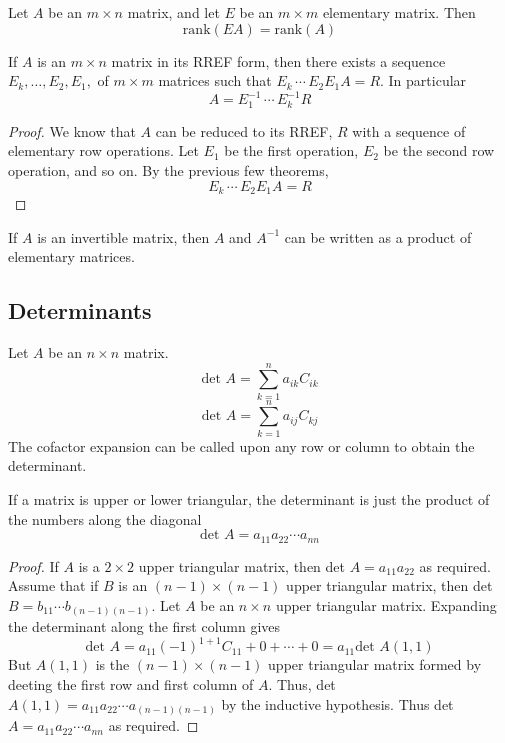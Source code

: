 \documentclass[english,12pt]{article}
\begin{document}
\begin{thrm}
Let $A$ be an $m \times n$ matrix, and let $E$ be an $m \times m$ elementary matrix. Then
\[\text{rank}(EA) = \text{rank}(A)\]
\end{thrm}

\begin{thrm}
If $A$ is an $m \times n$ matrix in its RREF form, then there exists a sequence $E_k,\dots,E_2,E_1,$ of $m \times m$ matrices such that
$E_k\,\cdots\,E_2 E_1 A = R$. In particular
\[A = E_1^{-1}\,\cdots\,E_k^{-1}R\]

\begin{proof}
We know that $A$ can be reduced to its RREF, $R$ with a sequence of elementary row operations. Let $E_1$ be the first operation, $E_2$ be the second row operation, and so on. By the previous few theorems,
\[E_k\,\cdots\,E_2 E_1 A = R\]
\end{proof}
\end{thrm}

\begin{thrm}
If $A$ is an invertible matrix, then $A$ and $A^{-1}$ can be written as a product of elementary matrices.
\end{thrm}

\subsection{Determinants}

\begin{thrm}
Let $A$ be an $n \times n$ matrix.
\[\text{det }A = \sum_{k=1}^n a_{ik}C_{ik}\]
\[\text{det }A = \sum_{k=1}^n a_{ij}C_{kj}\]
The cofactor expansion can be called upon any row or column to obtain the determinant.
\end{thrm}

\begin{thrm}
If a matrix is upper or lower triangular, the determinant is just the product of the numbers along the diagonal
\[\text{det }A = a_{11}a_{22}\cdots a_{nn}\]
\begin{proof}
If $A$ is a $2 \times 2$ upper triangular matrix, then det $A=a_{11}a_{22}$ as required. Assume that if $B$ is an $(n-1) \times (n-1)$ upper triangular matrix, then det $B = b_{11}\cdots b_{(n-1)(n-1)}$. Let $A$ be an $n \times n$ upper triangular matrix. Expanding the determinant along the first column gives
\[\text{det }A = a_{11}(-1)^{1+1}C_{11} + 0 + \cdots + 0 = a_{11} \text{det }A(1,1)\]
But $A(1,1)$ is the $(n-1) \times (n-1)$ upper triangular matrix formed by deeting the first row and first column of $A$. Thus, det $A(1,1) = a_{11}a_{22}\cdots a_{(n-1)(n-1)}$ by the inductive hypothesis. Thus det $A = a_{11}a_{22}\cdots a_{nn}$ as required.
\end{proof}
\end{thrm}
\end{document}
